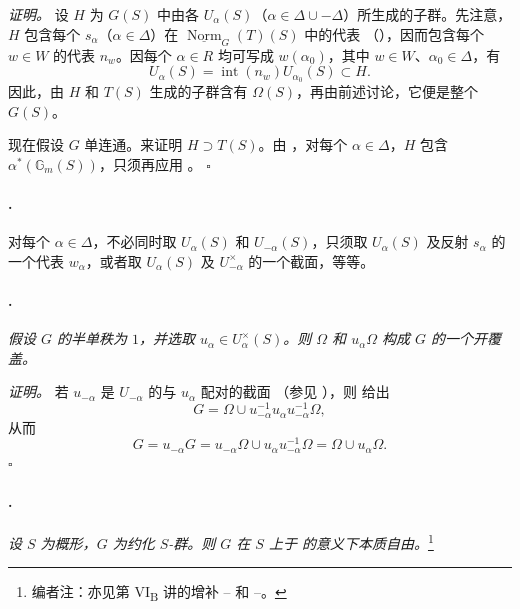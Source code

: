 \textit{证明。}
设 \(H\) 为 \(G(S)\) 中由各 \(U_\alpha(S)\)（\(\alpha\in\Delta\cup-\Delta\)）所生成的子群。先注意，\(H\) 包含每个 \(s_\alpha\)（\(\alpha\in\Delta\)）在 \(\underline{\operatorname{Norm}}_G(T)(S)\) 中的代表 \textup{（）}，因而包含每个 \(w\in W\) 的代表 \(n_w\)。因每个 \(\alpha\in R\) 均可写成 \(w(\alpha_0)\)，其中 \(w\in W\)、\(\alpha_0\in\Delta\)，有
\[
  U_\alpha(S)
  =
  \operatorname{int}(n_w)U_{\alpha_0}(S)
  \subset H.
\]
因此，由 \(H\) 和 \(T(S)\) 生成的子群含有 \(\Omega(S)\)，再由前述讨论，它便是整个 \(G(S)\)。

现在假设 \(G\) 单连通。来证明 \(H\supset T(S)\)。由 ，对每个 \(\alpha\in\Delta\)，\(H\) 包含 \(\alpha^*(\mathbb G_m(S))\)，只须再应用 。
\hfill\(\square\)

\paragraph{.}
对每个 \(\alpha\in\Delta\)，不必同时取 \(U_\alpha(S)\) 和 \(U_{-\alpha}(S)\)，只须取 \(U_\alpha(S)\) 及反射 \(s_\alpha\) 的一个代表 \(w_\alpha\)，或者取 \(U_\alpha(S)\) 及 \(U_{-\alpha}^{\times}\) 的一个截面，等等。

\paragraph{.}
\textit{假设 \(G\) 的半单秩为 \(1\)，并选取 \(u_\alpha\in U_\alpha^\times(S)\)。则 \(\Omega\) 和 \(u_\alpha\Omega\) 构成 \(G\) 的一个开覆盖。}

\textit{证明。}
若 \(u_{-\alpha}\) 是 \(U_{-\alpha}\) 的与 \(u_\alpha\) 配对的截面 \textup{（参见 ）}，则  \textup{} 给出
\[
  G
  =
  \Omega\cup
  u_{-\alpha}^{-1}u_\alpha u_{-\alpha}^{-1}\Omega,
\]
从而
\[
  G
  =
  u_{-\alpha}G
  =
  u_{-\alpha}\Omega\cup
  u_\alpha u_{-\alpha}^{-1}\Omega
  =
  \Omega\cup u_\alpha\Omega.
\]
\hfill\(\square\)

\paragraph{.}
\textit{设 \(S\) 为概形，\(G\) 为约化 \(S\)-群。则 \(G\) 在 \(S\) 上于  的意义下本质自由。}\footnote{编者注：亦见第 VI\textsubscript{B} 讲的增补 -- 和 --。}

